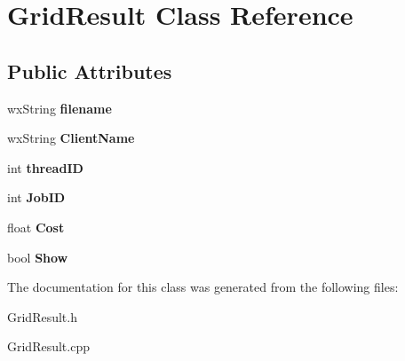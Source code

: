 \hypertarget{class_grid_result}{}\section{Grid\+Result Class Reference}
\label{class_grid_result}
\subsection*{Public Attributes}
\begin{DoxyCompactItemize}
\item 
\mbox{\label{class_grid_result_a903236dacd580e2baf723b34528f3b98}} 
wx\+String {\bfseries filename}
\item 
\mbox{\label{class_grid_result_a30fafee511fc57711648d30335e699ac}} 
wx\+String {\bfseries Client\+Name}
\item 
\mbox{\label{class_grid_result_a96e5d8b0e829a8c15f6e39b7bd3726ce}} 
int {\bfseries thread\+ID}
\item 
\mbox{\label{class_grid_result_af90cf8da710cb6814bb5f627eeaf6380}} 
int {\bfseries Job\+ID}
\item 
\mbox{\label{class_grid_result_a490810cbde5661883097587e8776fdac}} 
float {\bfseries Cost}
\item 
\mbox{\label{class_grid_result_a6d55bb11c2d5028e0c05b8c4d032584b}} 
bool {\bfseries Show}
\end{DoxyCompactItemize}


The documentation for this class was generated from the following files\+:\begin{DoxyCompactItemize}
\item 
Grid\+Result.\+h\item 
Grid\+Result.\+cpp\end{DoxyCompactItemize}
